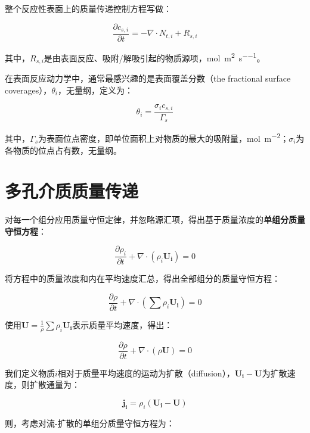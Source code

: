 整个反应性表面上的质量传递控制方程写做：

\begin{equation}\label{key}
\frac{\partial c_{s,i}}{\partial t} = -\nabla\cdot N_{t,i} + R_{s,i}
\end{equation}

其中，$ R_{s,i} $是由表面反应、吸附/解吸引起的物质源项，\si{\mole\per\meter\squared\per\second}。

在表面反应动力学中，通常最感兴趣的是表面覆盖分数（the fractional surface coverages），$ \theta_i $，无量纲，定义为：

\begin{equation}
\theta_i = \frac{\sigma_i c_{s,i}}{\Gamma_s}
\end{equation}

其中，$ \Gamma_s $为表面位点密度，即单位面积上对物质的最大的吸附量，\si{\mole\per\meter\squared}；$ \sigma_i $为各物质的位点占有数，无量纲。

\section{多孔介质质量传递}

对每一个组分应用质量守恒定律，并忽略源汇项，得出基于质量浓度的\textbf{单组分质量守恒方程}：

\begin{equation}
\frac{\partial \rho_i}{\partial t} + \nabla\cdot(\rho_i\bm{U_i}) = 0
\end{equation}

将方程中的质量浓度和内在平均速度汇总，得出全部组分的质量守恒方程：

\begin{equation}
\frac{\partial \rho}{\partial t} + \nabla\cdot(\sum\rho_i\bm{U_i}) = 0
\end{equation}

使用$ \bm{U}=\frac{1}{\rho}\sum\rho_i\bm{U_i} $表示质量平均速度，得出：

\begin{equation}
\frac{\partial \rho}{\partial t} + \nabla\cdot(\rho\bm{U}) = 0
\end{equation}

我们定义物质$ i $相对于质量平均速度的运动为扩散（diffusion），$ \bm{U_i}-\bm{U} $为扩散速度，则扩散通量为：

\begin{equation}
\bm{j_i} = \rho_i(\bm{U_i} - \bm{U})
\end{equation}

则，考虑对流-扩散的单组分质量守恒方程为：

